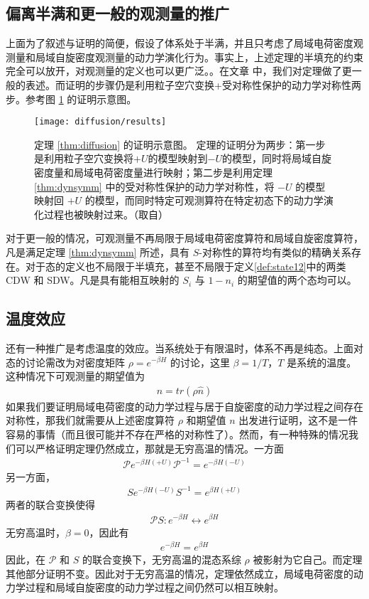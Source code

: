 \subsection{偏离半满和更一般的观测量的推广}
上面为了叙述与证明的简便，假设了体系处于半满，并且只考虑了局域电荷密度观测量和局域自旋密度观测量的动力学演化行为。事实上，上述定理的半填充的约束完全可以放开，对观测量的定义也可以更广泛。。在文章 中，我们对定理做了更一般的表述。而证明的步骤仍是利用粒子空穴变换+受对称性保护的动力学对称性两步。参考图 \ref{fig:diffusion:results} 的证明示意图。
\begin{figure}[!htb]
\centering
\texttt{[image: diffusion/results]}
\caption{定理 \ref{thm:diffusion} 的证明示意图。 定理的证明分为两步：第一步是利用粒子空穴变换将$+U$的模型映射到$-U$的模型，同时将局域自旋密度量和局域电荷密度量进行映射；第二步是利用定理 \ref{thm:dynsymm} 中的受对称性保护的动力学对称性，将 $-U$ 的模型映射回 $+U$ 的模型，而同时特定可观测算符在特定初态下的动力学演化过程也被映射过来。（取自）}
\label{fig:diffusion:results}
\end{figure}

对于更一般的情况，可观测量不再局限于局域电荷密度算符和局域自旋密度算符，凡是满足定理 \ref{thm:dynsymm} 所述，具有 $S$-对称性的算符均有类似的精确关系存在。对于态的定义也不局限于半填充，甚至不局限于定义\ref{def:state12}中的两类 CDW 和 SDW。凡是具有能相互映射的 $S_i$ 与 $1-n_i$ 的期望值的两个态均可以。


\subsection{温度效应}
还有一种推广是考虑温度的效应。当系统处于有限温时，体系不再是纯态。上面对态的讨论需改为对密度矩阵 $\rho=e^{-\beta H}$ 的讨论，这里 $\beta=1/T$，$T$ 是系统的温度。这种情况下可观测量的期望值为 
\begin{align}
n = tr(\rho\hat{n})
\end{align}
如果我们要证明局域电荷密度的动力学过程与居于自旋密度的动力学过程之间存在对称性，那我们就需要从上述密度算符 $\rho$ 和期望值 $n$ 出发进行证明，这不是一件容易的事情（而且很可能并不存在严格的对称性了）。然而，有一种特殊的情况我们可以严格证明定理仍然成立，那就是无穷高温的情况。一方面
\begin{align}
\mathcal{P}e^{-\beta H(+U)}\mathcal{P}^{-1} = e^{-\beta H(-U)}
\end{align}
另一方面，
\begin{align}
Se^{-\beta H(-U)}S^{-1} = e^{\beta H(+U)}
\end{align}
两者的联合变换使得
\begin{align}
\mathcal{P}S: e^{-\beta H} \leftrightarrow e^{\beta H}
\end{align}
无穷高温时，$\beta=0$，因此有
\begin{align}
e^{-\beta H} = e^{\beta H}
\end{align}
因此，在 $\mathcal{P}$ 和 $S$ 的联合变换下，无穷高温的混态系综 $\rho$ 被影射为它自己。而定理其他部分证明不变。因此对于无穷高温的情况，定理依然成立，局域电荷密度的动力学过程和局域自旋密度的动力学过程之间仍然可以相互映射。



